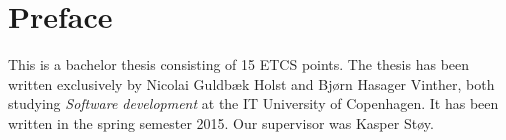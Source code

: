 \section*{Preface}
This is a bachelor thesis consisting of 15 ETCS points.
The thesis has been written exclusively by Nicolai Guldbæk Holst and Bjørn Hasager Vinther, both studying \textit{Software development} at the IT University of Copenhagen.  It has been written in the spring semester 2015. Our supervisor was Kasper Støy. 